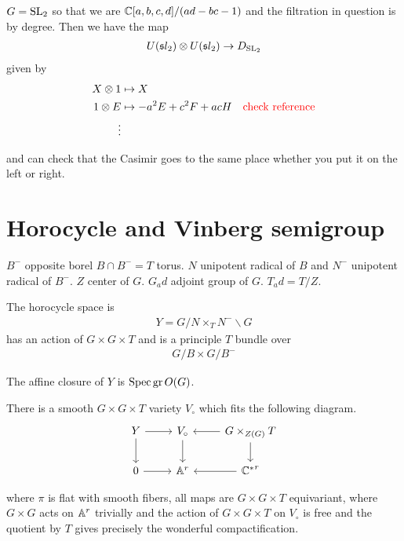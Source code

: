 \documentclass[12pt]{article}
\begin{document}
\begin{example}
    $G = \operatorname{SL}_2$ so that we are $\mathbb{C}[a,b,c,d]/(ad-bc-1)$ and the filtration
    in question is by degree. Then we have the map \begin{align*}
        U(\mathfrak{s}l_2) \otimes U(\mathfrak{s}l_2) \to D_{\operatorname{SL}_2}
    \end{align*} given by \begin{align*}
        X\otimes 1 &\mapsto X \\
        1\otimes E &\mapsto -a^2E + c^2F + acH \quad \text{\textcolor{red}{{check reference}}}\\
        \vdots
    \end{align*}
\end{example}
and can check that the Casimir goes to the same place whether you put it on the left or right.

\section{Horocycle and Vinberg semigroup}

$B^-$ opposite borel $B\cap B^- = T$ torus. 
$N$ unipotent radical of $B$ and $N^-$ unipotent radical of $B^-$.
$Z$ center of $G$.
$G_ad$ adjoint group of $G$.
$T_ad = T/Z$.

\begin{definition}
    The horocycle space is \begin{align*}
        Y = G/N\times_T N^-\backslash G
    \end{align*} has an action of $G\times G \times T$ 
    and is a principle $T$ bundle over \begin{align*}
        G/B\times G/B^- 
    \end{align*}
\end{definition}
 The affine closure of $Y$ is $\operatorname{Spec} \operatorname{gr} O(G)$.

 \begin{proposition}
    [Vinberg] There is a smooth $G\times G\times T$ variety $V_\circ$
    which fits the following diagram. 
\[\begin{tikzcd}
	Y & {V_\circ} & {G\times_{Z(G)} T} \\
	0 & {\mathbb{A}^r} & {\mathbb{C^*}^r}
	\arrow[from=1-1, to=1-2]
	\arrow[from=1-1, to=2-1]
	\arrow[from=1-2, to=2-2]
	\arrow[from=1-3, to=1-2]
	\arrow[from=1-3, to=2-3]
	\arrow[from=2-1, to=2-2]
	\arrow[from=2-3, to=2-2]
\end{tikzcd}\]
 \end{proposition} where $\pi$ is flat with smooth fibers, all maps are $G\times G\times T$ equivariant,
 where $G\times G$ acts on $\mathbb{A}^r$ trivially
and the action of $G\times G\times T$ on $V_\circ$ is free and 
the quotient by $T$ gives precisely the wonderful compactification.
\end{document}
